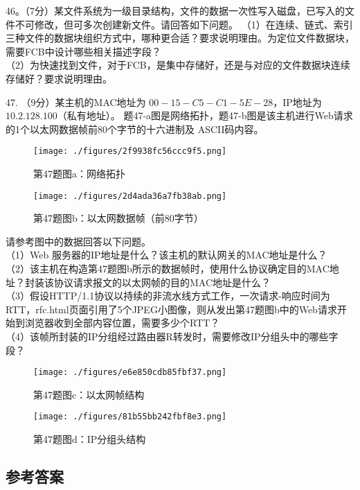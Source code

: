 46。（7分）某文件系统为一级目录结构，文件的数据一次性写入磁盘，已写入的文件不可修改，但可多次创建新文件。请回答如下问题。
（1）在连续、链式、索引三种文件的数据块组织方式中，哪种更合适？要求说明理由。为定位文件数据块，需要FCB中设计哪些相关描述字段？ \\
（2）为快速找到文件，对于FCB，是集中存储好，还是与对应的文件数据块连续存储好？要求说明理由。

47. （9分）某主机的MAC地址为 $00-15-C5-C1-5E-28$，IP地址为 $10.2.128.100$（私有地址）。 题47-a图是网络拓扑，题47-b图是该主机进行Web请求的1个以太网数据帧前80个字节的十六进制及 ASCII码内容。
\begin{figure}[ht]
\centering
\texttt{[image: ./figures/2f9938fc56ccc9f5.png]}
\caption{第47题图a：网络拓扑} \label{fig_Na11_5}
\end{figure}

\begin{figure}[ht]
\centering
\texttt{[image: ./figures/2d4ada36a7fb38ab.png]}
\caption{第47题图b：以太网数据帧（前80字节）} \label{fig_Na11_6}
\end{figure}

请参考图中的数据回答以下问题。 \\
（1）Web 服务器的IP地址是什么？该主机的默认网关的MAC地址是什么？ \\
（2）该主机在构造第47题图b所示的数据帧时，使用什么协议确定目的MAC地址？封装该协议请求报文的以太网帧的目的MAC地址是什么？ \\
（3）假设HTTP/1.1协议以持续的非流水线方式工作，一次请求-响应时间为RTT，rfc.html页面引用了5个JPEG小图像，则从发出第47题图b中的Web请求开始到浏览器收到全部内容位置，需要多少个RTT？ \\
（4）该帧所封装的IP分组经过路由器R转发时，需要修改IP分组头中的哪些字段？ \\
\begin{figure}[ht]
\centering
\texttt{[image: ./figures/e6e850cdb85fbf37.png]}
\caption{第47题图c：以太网帧结构} \label{fig_Na11_7}
\end{figure}
\begin{figure}[ht]
\centering
\texttt{[image: ./figures/81b55bb242fbf8e3.png]}
\caption{第47题图d：IP分组头结构} \label{fig_Na11_8}
\end{figure}




\subsection{参考答案}
